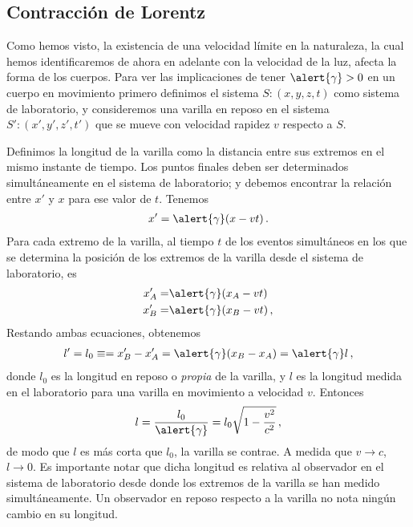 \subsection{Contracción de Lorentz}
\begin{frame}
Como hemos visto, la existencia de una velocidad límite en la naturaleza, la cual hemos identificaremos de ahora en adelante con la velocidad de la luz, afecta la forma de los cuerpos. Para ver las implicaciones de tener $\alert{\gamma}>0$ en un cuerpo en movimiento primero definimos el sistema $S:(x,y,z,t)$ como sistema de laboratorio, y consideremos una varilla en reposo en el sistema $S':(x',y',z',t')$ que se mueve con velocidad rapidez $v$ respecto a $S$. 

Definimos la longitud de la varilla como la distancia entre sus extremos en el mismo instante de tiempo. Los puntos finales deben ser determinados simultáneamente en el sistema de laboratorio; y debemos encontrar la relación entre $x'$ y $x$ para ese valor de $t$. Tenemos
\begin{align*}
  x'=\alert{\gamma}(x-vt)\,.
\end{align*}
Para cada extremo de la varilla, al tiempo $t$ de los eventos simultáneos en los que se determina la posición de los extremos de la varilla desde el sistema de laboratorio, es
\begin{align*}
  x'_A=&\alert{\gamma}(x_A-vt)\nonumber\\
  x'_B=&\alert{\gamma}(x_B-vt)\,,
\end{align*}
Restando ambas ecuaciones, obtenemos
\begin{align*}
  l'=l_0\equiv=x'_B-x'_A=\alert{\gamma}(x_B-x_A)=\alert{\gamma} l\,,
\end{align*}
donde $l_0$ es la longitud en reposo o \emph{propia} de la varilla, y $l$ es la longitud medida en el laboratorio para una varilla en movimiento a velocidad $v$. Entonces
\begin{align*}
  l=\frac{l_0}{\alert{\gamma}}=l_0\sqrt{1-\frac{v^2}{c^2}}\,,
\end{align*}
de modo que $l$ es más corta que $l_0$, la varilla se contrae. A medida que $v\to c$, $l\to 0$. Es importante notar que dicha longitud es relativa al observador en el sistema de laboratorio desde donde los extremos de la varilla se han medido simultáneamente. Un observador en reposo respecto a la varilla no nota ningún cambio en su longitud.
\end{frame}
